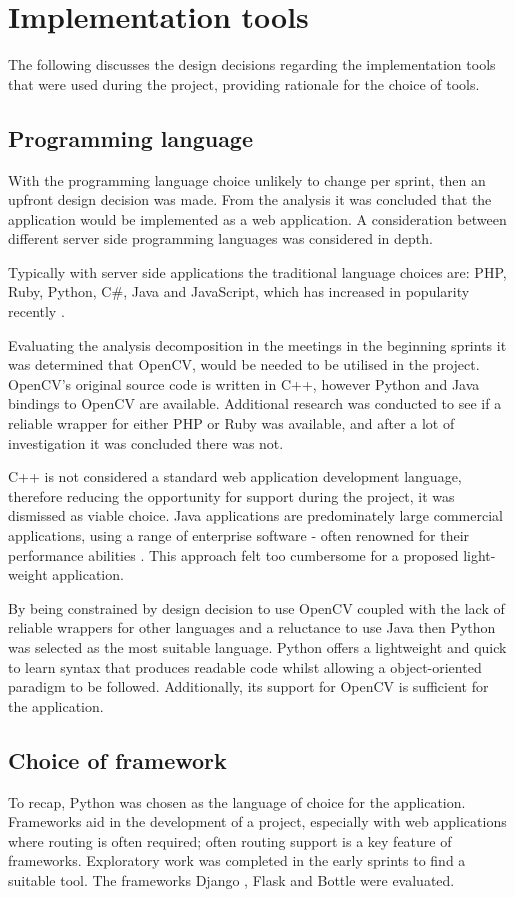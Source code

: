\section{Implementation tools}
The following discusses the design decisions regarding the implementation tools that were used during the project, providing rationale for the choice of tools.
\subsection{Programming language}
With the programming language choice unlikely to change per sprint, then an upfront design decision was made. From the analysis it was concluded that the application would be implemented as a web application.  A consideration between different server side programming languages was considered in depth.

Typically with server side applications the traditional language choices are: PHP, Ruby, Python, C\#, Java and JavaScript, which has increased in popularity recently \cite{citeulike:14018462}.

Evaluating the analysis decomposition in the meetings in the beginning sprints it was determined that OpenCV, would be needed to be utilised in the project. OpenCV's original source code is written in C++, however Python and Java bindings to OpenCV are available. Additional research was conducted to see if a reliable wrapper for either PHP or Ruby was available, and after a lot of investigation it was concluded there was not.

C++ is not considered a standard web application development language, therefore reducing the opportunity for support during the project, it was dismissed as viable choice. Java applications are predominately large commercial applications, using a range of enterprise software - often renowned for their performance abilities \cite{citeulike:14019744}. This approach felt too cumbersome for a proposed light-weight application.

By being constrained by design decision to use OpenCV coupled with the lack of reliable wrappers for other languages and a reluctance to use Java then Python was selected as the most suitable language. Python offers a lightweight and quick to learn syntax that produces readable code whilst allowing a object-oriented paradigm to be followed. Additionally, its support for OpenCV is sufficient for the application.


\subsection{Choice of framework}
To recap, Python was chosen as the language of choice for the application. Frameworks aid in the development of a project, especially with web applications where routing is often required; often routing support is a key feature of frameworks. Exploratory work was completed in the early sprints to find a suitable tool. The frameworks Django \cite{citeulike:14019784}, Flask \cite{citeulike:13160396} and Bottle \cite{citeulike:14019792} were evaluated.

